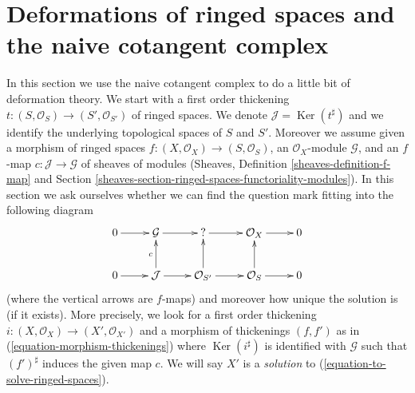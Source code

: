 \documentclass{stacks-project}
\theoremstyle{plain}
\theoremstyle{definition}
\theoremstyle{remark}
\numberwithin{equation}{subsection}
\def\Ker{\mathop{\mathrm{Ker}}}
\begin{document}
\section{Deformations of ringed spaces and the naive cotangent complex}
\label{section-deformations-ringed-spaces}

\noindent
In this section we use the naive cotangent complex to do a little bit
of deformation theory. We start with a first order thickening
$t : (S, \mathcal{O}_S) \to (S', \mathcal{O}_{S'})$ of ringed spaces.
We denote $\mathcal{J} = \Ker(t^\sharp)$ and we
identify the underlying topological spaces of $S$ and $S'$.
Moreover we assume given a morphism of ringed spaces
$f : (X, \mathcal{O}_X) \to (S, \mathcal{O}_S)$, an $\mathcal{O}_X$-module
$\mathcal{G}$, and an $f$-map $c : \mathcal{J} \to \mathcal{G}$
of sheaves of modules (Sheaves, Definition \ref{sheaves-definition-f-map}
and Section \ref{sheaves-section-ringed-spaces-functoriality-modules}).
In this section we ask ourselves whether we can find
the question mark fitting into the following diagram
\begin{equation}
\label{equation-to-solve-ringed-spaces}
\vcenter{
\xymatrix{
0 \ar[r] & \mathcal{G} \ar[r] & {?} \ar[r] & \mathcal{O}_X \ar[r] & 0 \\
0 \ar[r] & \mathcal{J} \ar[u]^c \ar[r] & \mathcal{O}_{S'} \ar[u] \ar[r] &
\mathcal{O}_S \ar[u] \ar[r] & 0
}
}
\end{equation}
(where the vertical arrows are $f$-maps)
and moreover how unique the solution is (if it exists). More precisely,
we look for a first order thickening
$i : (X, \mathcal{O}_X) \to (X', \mathcal{O}_{X'})$
and a morphism of thickenings $(f, f')$ as in
(\ref{equation-morphism-thickenings})
where $\Ker(i^\sharp)$ is identified with $\mathcal{G}$
such that $(f')^\sharp$ induces the given map $c$.
We will say $X'$ is a {\it solution} to
(\ref{equation-to-solve-ringed-spaces}).
\end{document}
